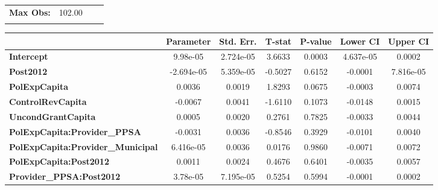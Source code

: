 \begin{center}
\begin{tabular}{lclc}
\textbf{Max Obs:}                                  &       102.00       & \textbf{                     }   &                  \\
\textbf{}                                          &                    & \textbf{                     }   &                  \\
\bottomrule
\end{tabular}
\begin{tabular}{lcccccc}
                                                   & \textbf{Parameter} & \textbf{Std. Err.} & \textbf{T-stat} & \textbf{P-value} & \textbf{Lower CI} & \textbf{Upper CI}  \\
\midrule
\textbf{Intercept}                                 &      9.98e-05      &     2.724e-05      &      3.6633     &      0.0003      &     4.637e-05     &       0.0002       \\
\textbf{Post2012}                                  &     -2.694e-05     &     5.359e-05      &     -0.5027     &      0.6152      &      -0.0001      &     7.816e-05      \\
\textbf{PolExpCapita}                              &       0.0036       &       0.0019       &      1.8293     &      0.0675      &      -0.0003      &       0.0074       \\
\textbf{ControlRevCapita}                          &      -0.0067       &       0.0041       &     -1.6110     &      0.1073      &      -0.0148      &       0.0015       \\
\textbf{UncondGrantCapita}                         &       0.0005       &       0.0020       &      0.2761     &      0.7825      &      -0.0033      &       0.0044       \\
\textbf{PolExpCapita:Provider\_PPSA}               &      -0.0031       &       0.0036       &     -0.8546     &      0.3929      &      -0.0101      &       0.0040       \\
\textbf{PolExpCapita:Provider\_Municipal}          &     6.416e-05      &       0.0036       &      0.0176     &      0.9860      &      -0.0071      &       0.0072       \\
\textbf{PolExpCapita:Post2012}                     &       0.0011       &       0.0024       &      0.4676     &      0.6401      &      -0.0035      &       0.0057       \\
\textbf{Provider\_PPSA:Post2012}                   &      3.78e-05      &     7.195e-05      &      0.5254     &      0.5994      &      -0.0001      &       0.0002       \\

\end{tabular}
\end{center}

